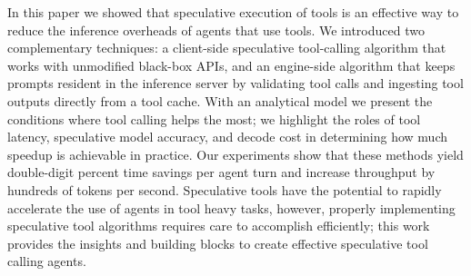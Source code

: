 In this paper we showed that speculative execution of tools is an effective way to reduce the inference overheads of agents that use tools. We introduced two complementary techniques: a client-side speculative tool-calling algorithm that works with unmodified black-box APIs, and an engine-side algorithm that keeps prompts resident in the inference server by validating tool calls and ingesting tool outputs directly from a tool cache. With an analytical model we present the conditions where tool calling helps the most; we highlight the roles of tool latency, speculative model accuracy, and decode cost in determining how much speedup is achievable in practice. Our experiments show that these methods yield double-digit percent time savings per agent turn and increase throughput by hundreds of tokens per second. 
Speculative tools have the potential to rapidly accelerate the use of agents in tool heavy tasks, however, properly implementing speculative tool algorithms requires care to accomplish efficiently; this work provides the insights and building blocks to create effective speculative tool calling agents.
